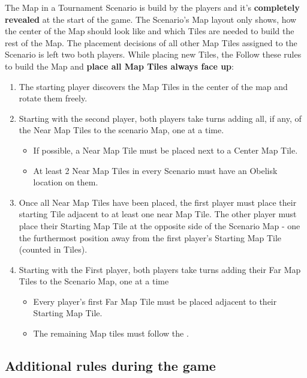 \begin{multicols*}{2}
The Map in a Tournament Scenario is build by the players and it's \textbf{completely revealed} at the start of the game.
The Scenario's Map layout only shows, how the center of the Map should look like and which Tiles are needed to build the rest of the Map.
The placement decisions of all other Map Tiles assigned to the Scenario is left two both players.
While placing new Tiles, the 
Follow these rules to build the Map and \textbf{place all Map Tiles always face up}:
\begin{enumerate}
    \item The starting player discovers the Map Tiles in the center of the map and rotate them freely.
    \item Starting with the second player, both players take turns adding all, if any, of the Near Map Tiles to the scenario Map, one at a time.
    \begin{itemize}
        \item If possible, a Near Map Tile must be placed next to a Center Map Tile.
        \item At least 2 Near Map Tiles in every Scenario must have an Obelisk location on them.
    \end{itemize}
    \item Once all Near Map Tiles have been placed, the first player must place their starting Tile adjacent to at least one near Map Tile. The other player must place their Starting Map Tile at the opposite side of the Scenario Map - one the furthermost position away from the first player's Starting Map Tile (counted in Tiles).
    \item Starting with the First player, both players take turns adding their Far Map Tiles to the Scenario Map, one at a time
    \begin{itemize}
        \item Every player's first Far Map Tile must be placed adjacent to their Starting Map Tile.
        \item The remaining Map tiles must follow the .
    \end{itemize}
\end{enumerate}

\subsection*{Additional rules during the game}


\end{multicols*}
